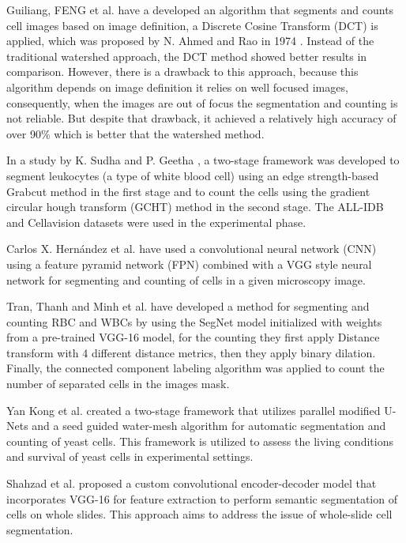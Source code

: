 \documentclass[conference]{IEEEtran}
\begin{document}
Guiliang, FENG et al.\cite{guiliang2016microscopic} have a developed an algorithm that segments and counts cell images based on image definition, a Discrete Cosine Transform (DCT) is applied, which was proposed by N. Ahmed and Rao in 1974 \cite{ahmed1974discrete}. Instead of the traditional watershed approach, the DCT method showed better results in comparison. However, there is a drawback to this approach, because this algorithm depends on image definition it relies on well focused images, consequently, when the images are out of focus the segmentation and counting is not reliable. But despite that drawback, it achieved a relatively high accuracy of over 90\% which is better that the watershed method.

In a study by K. Sudha and P. Geetha \cite{SUDHA2020639}, a two-stage framework was developed to segment leukocytes (a type of white blood cell) using an edge strength-based Grabcut method in the first stage and to count the cells using the gradient circular hough transform (GCHT) method in the second stage. The ALL-IDB \cite{labati2011all} and Cellavision \cite{Zheng2018} datasets were used in the experimental phase.

Carlos X. Hern{\'{a}}ndez et al. \cite{DBLP:journals/corr/abs-1802-10548} have used a convolutional neural network (CNN) using a feature pyramid network (FPN) combined with a VGG style neural network for segmenting and counting of cells in a given microscopy image.

Tran, Thanh and Minh et al. \cite{tran2019blood} have developed a method for segmenting and counting RBC and WBCs by using the SegNet model initialized with weights from a pre-trained VGG-16 model, for the counting they first apply Distance transform with 4 different distance metrics, then they apply binary dilation. Finally, the connected component labeling algorithm was applied to count the number of separated cells in the images mask. 

Yan Kong et al. \cite{Kong:20} created a two-stage framework that utilizes parallel modified U-Nets and a seed guided water-mesh algorithm for automatic segmentation and counting of yeast cells. This framework is utilized to assess the living conditions and survival of yeast cells in experimental settings.

Shahzad et al.  \cite{shahzad2020robust} proposed a custom convolutional encoder-decoder model that incorporates VGG-16 for feature extraction to perform semantic segmentation of cells on whole slides. This approach aims to address the issue of whole-slide cell segmentation. 
\end{document}
